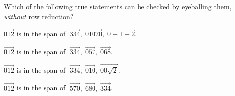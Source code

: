 \begin{pollframe}

\smallskip
\begin{bluebox}[Poll]{.8\textwidth}
  Which of the following true statements can be checked by eyeballing them,
  \emph{without} row reduction?
  \medskip
  \begin{eAlpherate}
  \item $\vec{0 1 2}$ is in the span of
    $\;\vec{3 3 4},\; \vec{0 10 20},\; \vec{0 -1 -2}$.
  \item $\vec{0 1 2}$ is in the span of
    $\;\vec{3 3 4},\; \vec{0 5 7},\; \vec{0 6 8}$.
  \item $\vec{0 1 2}$ is in the span of
    $\;\vec{3 3 4},\; \vec{0 1 0},\; \vec{0 0 \sqrt2}$.
  \item $\vec{0 1 2}$ is in the span of
    $\;\vec{5 7 0},\; \vec{6 8 0},\; \vec{3 3 4}$.
  \end{eAlpherate}
\end{bluebox}


\end{pollframe}



